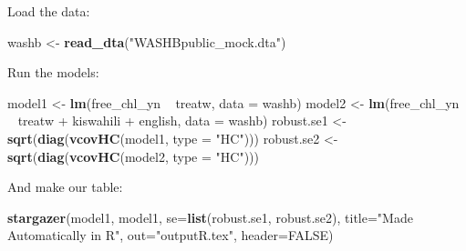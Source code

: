 \documentclass[11pt,]{article}
\newenvironment{Shaded}{\begin{snugshade}}{\end{snugshade}}
\newcommand{\KeywordTok}[1]{\textcolor[rgb]{0.13,0.29,0.53}{\textbf{{#1}}}}
\newcommand{\DataTypeTok}[1]{\textcolor[rgb]{0.13,0.29,0.53}{{#1}}}
\newcommand{\StringTok}[1]{\textcolor[rgb]{0.31,0.60,0.02}{{#1}}}
\newcommand{\OtherTok}[1]{\textcolor[rgb]{0.56,0.35,0.01}{{#1}}}
\newcommand{\NormalTok}[1]{{#1}}
\begin{document}
Load the data:

\begin{Shaded}
\begin{Highlighting}[]
\NormalTok{washb <-}\StringTok{ }\KeywordTok{read_dta}\NormalTok{(}\StringTok{"WASHBpublic_mock.dta"}\NormalTok{)}
\end{Highlighting}
\end{Shaded}

Run the models:

\begin{Shaded}
\begin{Highlighting}[]
\NormalTok{model1 <-}\StringTok{ }\KeywordTok{lm}\NormalTok{(free_chl_yn ~}\StringTok{ }\NormalTok{treatw, }\DataTypeTok{data =} \NormalTok{washb) }
\NormalTok{model2 <-}\StringTok{ }\KeywordTok{lm}\NormalTok{(free_chl_yn ~}\StringTok{ }\NormalTok{treatw +}\StringTok{ }\NormalTok{kiswahili +}\StringTok{ }\NormalTok{english, }\DataTypeTok{data =} \NormalTok{washb)}
\NormalTok{robust.se1 <-}\StringTok{ }\KeywordTok{sqrt}\NormalTok{(}\KeywordTok{diag}\NormalTok{(}\KeywordTok{vcovHC}\NormalTok{(model1, }\DataTypeTok{type =} \StringTok{"HC"}\NormalTok{)))}
\NormalTok{robust.se2 <-}\StringTok{ }\KeywordTok{sqrt}\NormalTok{(}\KeywordTok{diag}\NormalTok{(}\KeywordTok{vcovHC}\NormalTok{(model2, }\DataTypeTok{type =} \StringTok{"HC"}\NormalTok{)))}
\end{Highlighting}
\end{Shaded}

And make our table:

\begin{Shaded}
\begin{Highlighting}[]
\KeywordTok{stargazer}\NormalTok{(model1, model1, }\DataTypeTok{se=}\KeywordTok{list}\NormalTok{(robust.se1, robust.se2), }
          \DataTypeTok{title=}\StringTok{"Made Automatically in R"}\NormalTok{, }
          \DataTypeTok{out=}\StringTok{"outputR.tex"}\NormalTok{, }\DataTypeTok{header=}\OtherTok{FALSE}\NormalTok{)}
\end{Highlighting}
\end{Shaded}
\end{document}
